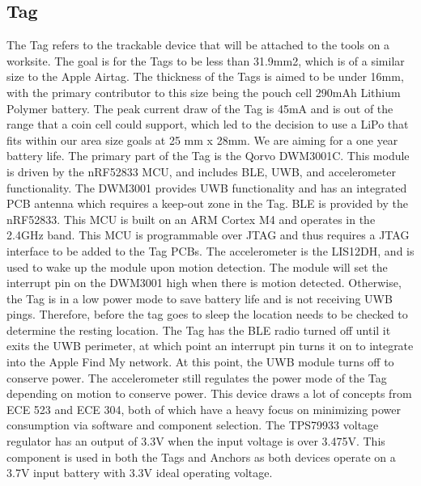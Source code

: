 \documentclass[conference]{IEEEtran}
\begin{document}
\subsection{Tag}\label{AA}
The Tag refers to the trackable device that will be attached to the tools 
on a worksite. The goal is for the Tags to be less than 31.9mm2, which is 
of a similar size to the Apple Airtag. The thickness of the Tags is aimed 
to be under 16mm, with the primary contributor to this size being the 
pouch cell 290mAh Lithium Polymer battery. The peak current draw of the 
Tag is 45mA and is out of the range that a coin cell could support, 
which led to the decision to use a LiPo that fits within our area size 
goals at 25 mm x 28mm. We are aiming for a one year battery life.
The primary part of the Tag is the Qorvo DWM3001C. This module is driven 
by the nRF52833 MCU, and includes BLE, UWB, and accelerometer 
functionality. The DWM3001 provides UWB functionality and has an 
integrated PCB antenna which requires a keep-out zone in the Tag. 
BLE is provided by the nRF52833. This MCU is built on an ARM Cortex 
M4 and operates in the 2.4GHz band. This MCU is programmable over 
JTAG and thus requires a JTAG interface to be added to the Tag PCBs. 
The accelerometer is the LIS12DH, and is used to wake up the module 
upon motion detection. The module will set the interrupt pin on the 
DWM3001 high when there is motion detected. Otherwise, the Tag is in a 
low power mode to save battery life and is not receiving UWB pings. 
Therefore, before the tag goes to sleep the location needs to be checked 
to determine the resting location. The Tag has the BLE radio turned off 
until it exits the UWB perimeter, at which point an interrupt pin turns 
it on to integrate into the Apple Find My network. At this point, the 
UWB module turns off to conserve power. The accelerometer still regulates 
the power mode of the Tag depending on motion to conserve power. This 
device draws a lot of concepts from ECE 523 and ECE 304, both of which 
have a heavy focus on minimizing power consumption via software and 
component selection. The TPS79933 voltage regulator has an output of 
3.3V when the input voltage is over 3.475V. This component is used in 
both the Tags and Anchors as both devices operate on a 3.7V input battery 
with 3.3V ideal operating voltage. 
\end{document}
